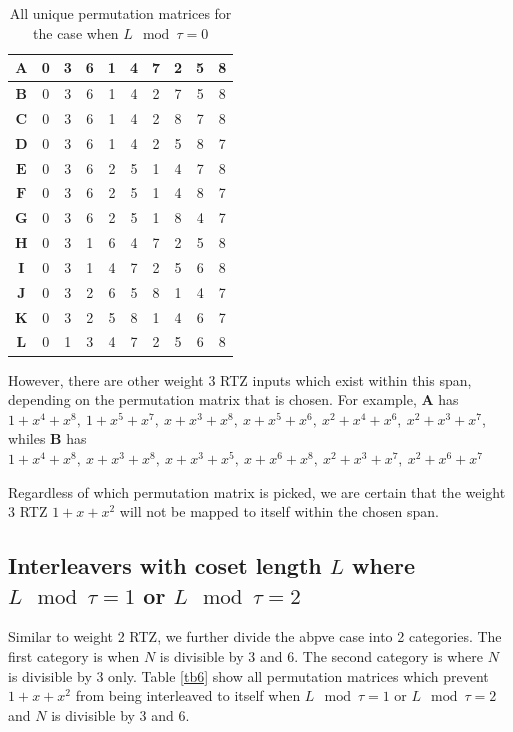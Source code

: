 \documentclass[11pt, oneside, dvipdfmx]{book}
\begin{document}
\begin{table}[h!]
\centering
\begin{tabular}{|c || c  c  c  c  c  c  c  c  c |} 
 \hline
 $\mathbf{A}$ & 0 & 3 & 6 & 1 & 4 & 7 & 2 & 5 & 8\\ 
  \hline
 $\mathbf{B}$ & 0 & 3 & 6 & 1 & 4 & 2 & 7 & 5 & 8\\ 
 \hline
$\mathbf{C}$ & 0 & 3 & 6 & 1 & 4 & 2 & 8 & 7 & 8\\ 
 \hline
$\mathbf{D}$ & 0 & 3 & 6 & 1 & 4 & 2 & 5 & 8 & 7\\ 
 \hline
 $\mathbf{E}$ & 0 & 3 & 6 & 2 & 5 & 1 & 4 & 7 & 8\\ 
 \hline
 $\mathbf{F}$ & 0 & 3 & 6 & 2 & 5 & 1 & 4 & 8 & 7\\ 
 \hline
 $\mathbf{G}$ & 0 & 3 & 6 & 2 & 5 & 1 & 8 & 4 & 7\\ 
 \hline
  $\mathbf{H}$ & 0 & 3 & 1 & 6 & 4 & 7 & 2 & 5 & 8\\ 
 \hline
  $\mathbf{I}$ & 0 & 3 & 1 & 4 & 7 & 2 & 5 & 6 & 8\\ 
 \hline
 $\mathbf{J}$ & 0 & 3 & 2 & 6 & 5 & 8 & 1 & 4 & 7\\ 
 \hline
  $\mathbf{K}$ & 0 & 3 & 2 & 5 & 8 & 1 & 4 & 6 & 7\\ 
 \hline
  $\mathbf{L}$ & 0 & 1 & 3 & 4 & 7 & 2 & 5 & 6 & 8\\ 
 \hline
\end{tabular}
\caption{All unique permutation matrices for the case when $L \mod \tau =0$}
\label{tb5}
\end{table}
 
 However, there are other weight 3 RTZ inputs which exist within this span, depending on the permutation matrix that is chosen. For example, $\mathbf{A}$ has  $1 +x^4+x^8,~ 1+x^5+x^7, ~x+x^3+x^8,~ x+x^5+x^6,~x^2+x^4+x^6,~x^2+x^3+x^7$, whiles $\mathbf{B}$ has $1+x^4+x^8,~x+x^3+x^8,~x+x^3+x^5,~x+x^6+x^8,~x^2+x^3+x^7,
 ~x^2+x^6+x^7$
 
 Regardless of which permutation matrix is picked, we are certain that the weight 3 RTZ $1+x+x^2$ will not be mapped to itself within the chosen span.
 
 \subsection{Interleavers with coset length $L$ where $L \mod \tau =1$ or $L \mod \tau =2$}
 
Similar to weight 2 RTZ, we further divide the abpve case into 2 categories. The first category is when $N$ is divisible by $3$ and $6$. The second category is where $N $ is divisible by 3 only. Table \ref{tb6} show all permutation matrices which prevent $1+x+x^2$ from being interleaved to itself when $L \mod \tau =1$ or $L \mod \tau =2$ and $N$ is divisible by $3$ and $6$.
 
\end{document}
